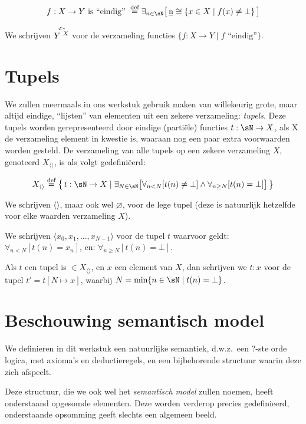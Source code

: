 $$ f : X \to Y \text{ is ``eindig'' } \DEF \exists_{n \in \sN} \surr{ \underbar{n} \cong \{ x \in X \mid f(x) \neq \bot \} } $$

We schrijven $\FiniteFunctions{Y}{X}$ voor de verzameling functies $\{f : X \to Y \mid f \text{ ``eindig''} \}$.

\section{Tupels}

We zullen meermaals in ons werkstuk gebruik maken van willekeurig grote, maar altijd eindige, ``lijsten'' van elementen uit een zekere verzameling: \emph{tupels}. Deze tupels worden gerepresenteerd door eindige (partiële) functies $t : \sN \to X$, als X de verzameling element in kwestie is, waaraan nog een paar extra voorwaarden worden gesteld. De verzameling van alle tupels op een zekere verzameling $X$, genoteerd $X_{\langle\rangle}$, is als volgt gedefiniëerd:

$$ X_{\langle\rangle} \DEF \big\{\, t : \sN \to X \mid \exists_{N \in \sN} \big[ \forall_{n < N}[t(n) \neq \bot] \land \forall_{n\ge N}[t(n) = \bot] \big] \,\big\} $$

We schrijven $\langle\rangle$, maar ook wel $\varnothing$, voor de lege tupel (deze is natuurlijk hetzelfde voor elke waarden verzameling $X$).

We schrijven $\langle x_0, x_1, \dots, x_{N-1}\rangle$ voor de tupel $t$ waarvoor geldt: $\forall_{n < N}[t(n) = x_n]$, en: $\forall_{n \ge N}[t(n) = \bot]$.

Als $t$ een tupel is $\in X_{\langle\rangle}$, en $x$ een element van $X$, dan schrijven we $t:x$ voor de tupel $t' = t[N \mapsto x]$, waarbij $N = \min\{n\in\sN \mid t(n) = \bot\}$.

\section{Beschouwing semantisch model}

We definieren in dit werkstuk een natuurlijke semantiek, d.w.z.~een ?-ste orde logica, met axioma's en deductieregels, en een bijbehorende structuur waarin deze zich afspeelt.

Deze structuur, die we ook wel het \emph{semantisch model} zullen noemen, heeft onderstaand opgesomde elementen. Deze worden verderop precies gedefinieerd, onderstaande opsomming geeft slechts een algemeen beeld.

